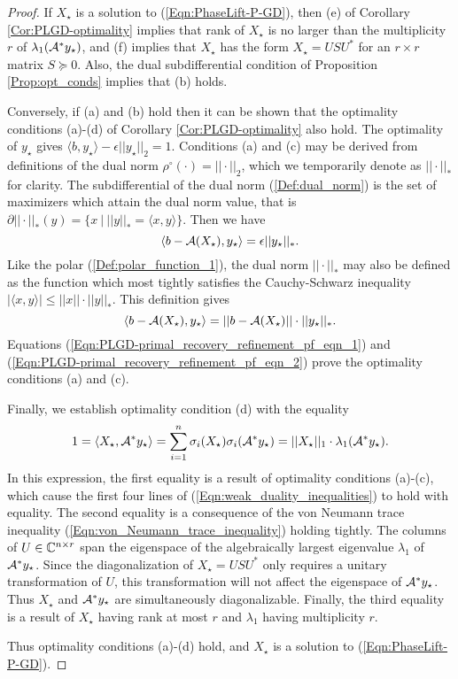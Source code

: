 \begin{proof}
If $X_\star$ is a solution to (\ref{Eqn:PhaseLift-P-GD}), then (e) of Corollary \ref{Cor:PLGD-optimality} implies that rank of $X_\star$ is no larger than the multiplicity $r$ of $\lambda_1({\mathcal A}^*y_\star)$, and (f) implies that $X_\star$ has the form $X_\star = USU^*$ for an $r \times r$ matrix $S \succeq 0$.  Also, the dual subdifferential condition of Proposition \ref{Prop:opt_conds} implies that (b) holds.

Conversely, if (a) and (b) hold then it can be shown that the optimality conditions (a)-(d) of Corollary \ref{Cor:PLGD-optimality} also hold.  The optimality of $y_\star$ gives $\langle b, y_\star \rangle - \epsilon ||y_\star||_2 = 1$.  
Conditions (a) and (c) may be derived from definitions of the dual norm $\rho^\circ(\cdot) = ||\cdot||_2$, which we temporarily denote as $||\cdot||_*$ for clarity. 
The subdifferential of the dual norm (\ref{Def:dual_norm}) is the set of maximizers which attain the dual norm value, that is $\partial || \cdot ||_* (y) = \{ x \ | \ ||y||_* = \langle x,y \rangle \}$.  
Then we have
\begin{equation}			\label{Eqn:PLGD-primal_recovery_refinement_pf_eqn_1}
\langle b - {\mathcal A}(X_\star), y_\star \rangle = \epsilon ||y_\star||_*.
\end{equation}
Like the polar (\ref{Def:polar_function_1}), the dual norm $||\cdot||_*$ may also be defined as the function which most tightly satisfies the Cauchy-Schwarz inequality $|\langle x, y \rangle| \leq ||x|| \cdot ||y||_*$.  This definition gives
\begin{equation}			\label{Eqn:PLGD-primal_recovery_refinement_pf_eqn_2}
\langle b - {\mathcal A}(X_\star), y_\star \rangle = ||b-{\mathcal A}(X_\star)|| \cdot ||y_\star||_*.
\end{equation} 
Equations (\ref{Eqn:PLGD-primal_recovery_refinement_pf_eqn_1}) and (\ref{Eqn:PLGD-primal_recovery_refinement_pf_eqn_2}) prove the optimality conditions (a) and (c).

Finally, we establish optimality condition (d) with the equality
\[
1 = \langle X_\star, {\mathcal A}^*y_\star \rangle = \sum_{i=1}^n \sigma_i(X_\star) \sigma_i({\mathcal A}^*y_\star) = ||X_\star||_1 \cdot \lambda_1({\mathcal A}^*y_\star).
\]
In this expression, the first equality is a result of optimality conditions (a)-(c), which cause the first four lines of (\ref{Eqn:weak_duality_inequalities}) to hold with equality.  
The second equality is a consequence of the von Neumann trace inequality (\ref{Eqn:von_Neumann_trace_inequality}) holding tightly.  The columns of $U \in {\mathbb C}^{n \times r}$ span the eigenspace of the algebraically largest eigenvalue $\lambda_1$ of ${\mathcal A}^*y_\star$.  
Since the diagonalization of $X_\star = USU^*$ only requires a unitary transformation of $U$, this transformation will not affect the eigenspace of ${\mathcal A}^*y_\star$.  
Thus $X_\star$ and ${\mathcal A}^*y_\star$ are simultaneously diagonalizable.  Finally, the third equality is a result of $X_\star$ having rank at most $r$ and $\lambda_1$ having multiplicity $r$.

Thus optimality conditions (a)-(d) hold, and  $X_\star$ is a solution to (\ref{Eqn:PhaseLift-P-GD}).


\end{proof}


